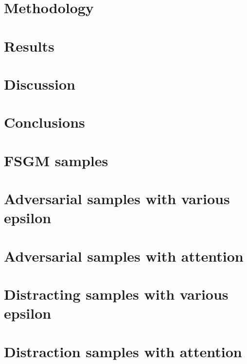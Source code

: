 \documentclass[a4paper,10pt]{article}
\begin{document}
\newpage
\section{Methodology}\label{chapter:methodology}


\newpage
\section{Results}\label{chapter:results}


\newpage
\section{Discussion}\label{chapter:discussion}


\newpage
\section{Conclusions}\label{chapter:conclusions}


\clearemptydoublepage

%



\clearemptydoublepage

\appendix
{}

\section{FSGM samples}
\label{appendix:fast_noise_examples}

\newpage
\section{Adversarial samples with various epsilon}\label{appendix:adversarial_samples_various_epsilon}

\section{Adversarial samples with attention}\label{appendix:adversarial_samples_with_attention}

\newpage
\section{Distracting samples with various epsilon}\label{appendix:distracting_samples_various_epsilon}

\newpage
\section{Distraction samples with attention}\label{appendix:distracting_samples_with_attention}

\newpage
\end{document}

